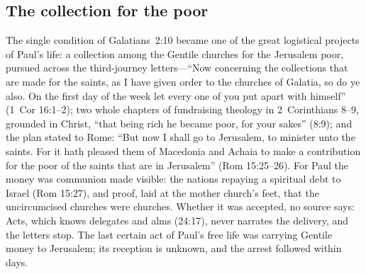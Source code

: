 \subsection{The collection for the poor}

The single condition of Galatians~2:10 became one of the great logistical
projects of Paul's life: a collection among the Gentile churches for the
Jerusalem poor, pursued across the third-journey letters---``Now
concerning the collections that are made for the saints, as I have given
order to the churches of Galatia, so do ye also. On the first day of the
week let every one of you put apart with himself'' (1~Cor 16:1--2); two
whole chapters of fundraising theology in 2~Corinthians 8--9, grounded in
Christ, ``that being rich he became poor, for your sakes'' (8:9); and the
plan stated to Rome: ``But now I shall go to Jerusalem, to minister unto
the saints. For it hath pleased them of Macedonia and Achaia to make a
contribution for the poor of the saints that are in Jerusalem'' (Rom
15:25--26). For Paul the money was communion made visible: the nations
repaying a spiritual debt to Israel (Rom 15:27), and proof, laid at the
mother church's feet, that the uncircumcised churches were churches.
Whether it was accepted, no source says: Acts, which knows delegates and
alms (24:17), never narrates the delivery, and the letters stop. The last
certain act of Paul's free life was carrying Gentile money to Jerusalem;
its reception is unknown, and the arrest followed within days.
